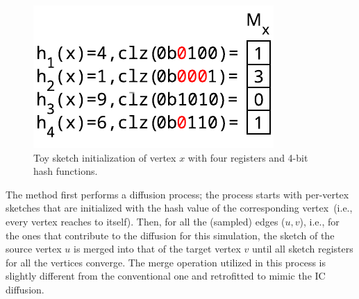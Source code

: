 \begin{figure}
    \begin{center}
      \includegraphics[width=1\linewidth]{images/fminit.pdf}
    \end{center}
    \caption{Toy sketch initialization of vertex $x$ with four registers and 4-bit hash functions.}
  \end{figure}
The method first performs a diffusion process; the process starts with per-vertex sketches that are initialized with the hash value of the corresponding vertex~(i.e., every vertex reaches to itself). Then, for all the (sampled) edges ($u, v$), i.e., for the ones that contribute to the diffusion for this simulation, the sketch of the source vertex $u$ is merged into that of the target vertex $v$ until all sketch registers for all the vertices converge. The merge operation utilized in this process is slightly different from the conventional one and retrofitted to mimic the IC diffusion. 

